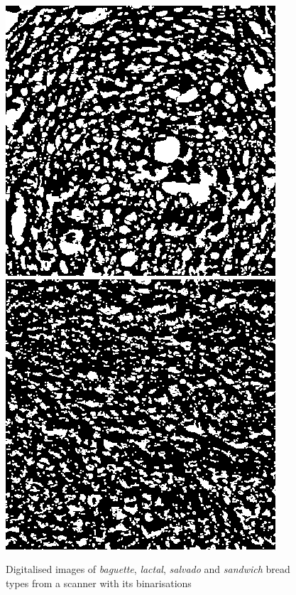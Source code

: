 \documentclass[oneside,a4paper,english,links,12pt]{article}
\begin{document}
\begin{figure}[htb]
\includegraphics[scale=0.26]{imagenes/salvado43bin}
\includegraphics[scale=0.26]{imagenes/sandwich43bin}
\caption{Digitalised images of {\em baguette}, {\em lactal}, {\em salvado} and {\em sandwich} bread types from a scanner with its binarisations}
\label{fig:bread}
\end{figure}
\end{document}
